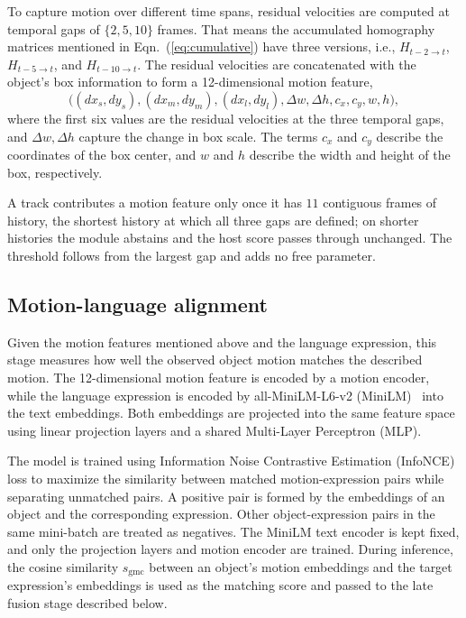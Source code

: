 \documentclass{article}
\begin{document}
To capture motion over different time spans, residual velocities are computed at temporal gaps of $\{2,5,10\}$ frames. That means the accumulated homography matrices mentioned in Eqn.~(\ref{eq:cumulative}) have three versions, i.e., $H_{t-2 \to t}$, $H_{t-5 \to t}$, and $H_{t-10 \to t}$. The residual velocities are concatenated with the object's box information to form a 12-dimensional motion feature,
\begin{equation}
  \bigl((dx_s,dy_s),(dx_m,dy_m),(dx_l,dy_l),\Delta w,\Delta h,c_x,c_y,w,h\bigr),
  \label{eq:descriptor}
\end{equation}
where the first six values are the residual velocities at the three temporal gaps, and $\Delta w, \Delta h$ capture the change in box scale. The terms $c_x$ and $c_y$ describe the coordinates of the box center, and $w$ and $h$ describe the width and height of the box, respectively.

A track contributes a motion feature only once it has $11$ contiguous frames of history, the shortest history at which all three gaps are defined; on shorter histories the module abstains and the host score passes through unchanged. The threshold follows from the largest gap and adds no free parameter.

\subsection{Motion-language alignment}
\label{sec:align}
Given the motion features mentioned above and the language expression, this stage measures how well the observed object motion matches the described motion. The 12-dimensional motion feature is encoded by a motion encoder, while the language expression is encoded by all-MiniLM-L6-v2 (MiniLM)~\cite{sbert} into the text embeddings. Both embeddings are projected into the same feature space using linear projection layers and a shared Multi-Layer Perceptron (MLP).

The model is trained using Information Noise Contrastive Estimation (InfoNCE)~\cite{infonce} loss to maximize the similarity between matched motion-expression pairs while separating unmatched pairs. A positive pair is formed by the embeddings of an object and the corresponding expression. Other object-expression pairs in the same mini-batch are treated as negatives. The MiniLM text encoder is kept fixed, and only the projection layers and motion encoder are trained. During inference, the cosine similarity $s_{\mathrm{gmc}}$ between an object's motion embeddings and the target expression's embeddings is used as the matching score and passed to the late fusion stage described below.
\end{document}
